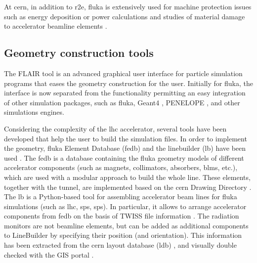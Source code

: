 \documentclass[encoding=utf8,british]{tumphthesis}
\begin{document}
At \acrshort{cern}, in addition to \acrshort{r2e}, \acrshort{fluka} is extensively used for machine protection issues such as energy deposition or power calculations and studies of material damage to accelerator beamline elements \cite{doi:10.13182/NT09-A9285, Method-for-Measuring-Mixed-Field-Radiation-Levels-Relevant-for-SEEs-at-the-LHC}. 


\subsection{Geometry construction tools}
\label{subsection:FLUKA-geometry}

The FLAIR tool \cite{FLAIR-vasilis, FLAIR:website} is an advanced graphical user interface for particle simulation programs that eases the geometry construction for the user. Initially for \acrshort{fluka}, the interface is now separated from the functionality permitting an easy integration of other simulation packages, such as \acrshort{fluka}, Geant4 \cite{GEANT4:website, AGOSTINELLI2003250, 1610988, ALLISON2016186}, PENELOPE \cite{32da5043}, and other simulations engines.


Considering the complexity of the \acrshort{lhc} accelerator, several tools have been developed that help the user to build the simulation files. In order to implement the geometry, \acrshort{fluka} Element Database (\acrshort{fedb}) and the linebuilder (\acrshort{lb}) have been used \cite{Mereghetti:2012zz}. The fedb is a database containing the \acrshort{fluka} geometry models of different accelerator components (such as magnets, collimators, absorbers, \acrshort{blm}s, etc.), which are used with a modular approach to build the whole line. These elements, together with the tunnel, are implemented based on the \acrshort{cern} Drawing Directory \cite{CDD:website}. The \acrshort{lb} is a Python-based tool for assembling accelerator beam lines for \acrshort{fluka} simulations (such as \acrshort{lhc}, \acrshort{sps}, \acrshort{sps}). In particular, it allows to arrange accelerator components from fedb on the basis of TWISS file information \cite{TWISS:website}. The radiation monitors are not beamline elements, but can be added as additional components to LineBuilder by specifying their position (and orientation). This information has been extracted from the \acrshort{cern} layout database (\acrshort{ldb}) \cite{CERN-layout:website}, and visually double checked with the GIS portal \cite{GIS:website}. 
\end{document}
